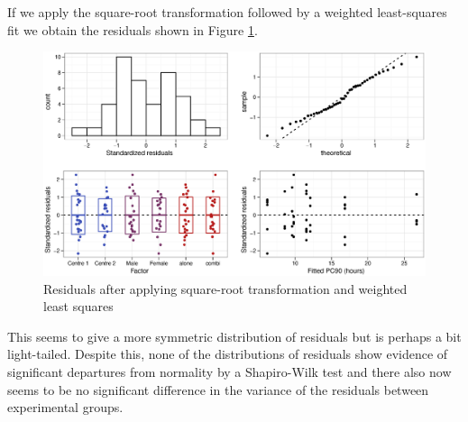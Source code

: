 If we apply the square-root transformation followed by a weighted least-squares fit we obtain the residuals shown in Figure \ref{aovsqrtresw}.
\begin{figure}[p]
\includegraphics[width=6.5in]{aovsqrtresw.eps} 
\caption{Residuals after applying square-root transformation and weighted least squares}
\label{aovsqrtresw}
\end{figure}
This seems to give a more symmetric distribution of residuals but is perhaps a bit light-tailed.
Despite this, none of the distributions of residuals show evidence of significant departures from normality by a Shapiro-Wilk test and there also now seems to be no significant difference in the variance of the residuals between experimental groups.


